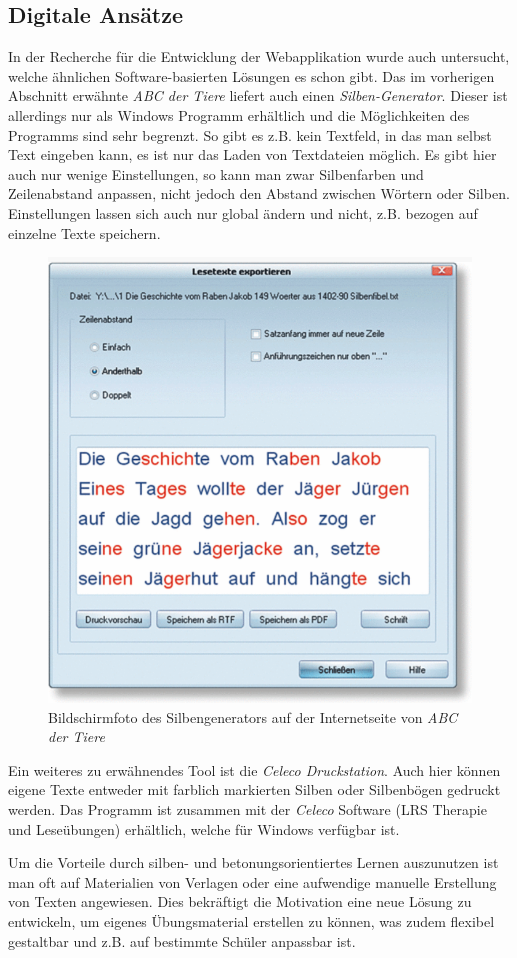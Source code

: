 \subsection{Digitale Ansätze}
\label{sec:lrs-digital}

In der Recherche für die Entwicklung der Webapplikation wurde auch untersucht, welche ähnlichen Software-basierten Lösungen es schon gibt. Das im vorherigen Abschnitt erwähnte \textit{ABC der Tiere} liefert auch einen \textit{Silben-Generator}\cite{ABCSilbengenerator2018}. Dieser ist allerdings nur als Windows Programm erhältlich und die Möglichkeiten des Programms sind sehr begrenzt. So gibt es z.B. kein Textfeld, in das man selbst Text eingeben kann, es ist nur das Laden von Textdateien möglich. Es gibt hier auch nur wenige Einstellungen, so kann man zwar Silbenfarben und Zeilenabstand anpassen, nicht jedoch den Abstand zwischen Wörtern oder Silben. Einstellungen lassen sich auch nur global ändern und nicht, z.B. bezogen auf einzelne Texte speichern.

\begin{figure}[h!]
	\centering
	\includegraphics[width=.5\linewidth]{figures/ABCsilbengenerator}
	\caption{Bildschirmfoto des Silbengenerators auf der Internetseite von \textit{ABC der Tiere}\cite{ABCSilbengenerator2018}}
	\label{fig:ABCsilbengenerator}
\end{figure}

Ein weiteres zu erwähnendes Tool ist die \textit{Celeco Druckstation}\cite{celeco2018}. Auch hier können eigene Texte entweder mit farblich markierten Silben oder Silbenbögen gedruckt werden. Das Programm ist zusammen mit der \textit{Celeco} Software (LRS Therapie und Leseübungen) erhältlich, welche für Windows verfügbar ist.

Um die Vorteile durch silben- und betonungsorientiertes Lernen auszunutzen ist man oft auf Materialien von Verlagen oder eine aufwendige manuelle Erstellung von Texten angewiesen. Dies bekräftigt die Motivation eine neue Lösung zu entwickeln, um eigenes Übungsmaterial erstellen zu können, was zudem flexibel gestaltbar und z.B. auf bestimmte Schüler anpassbar ist.


